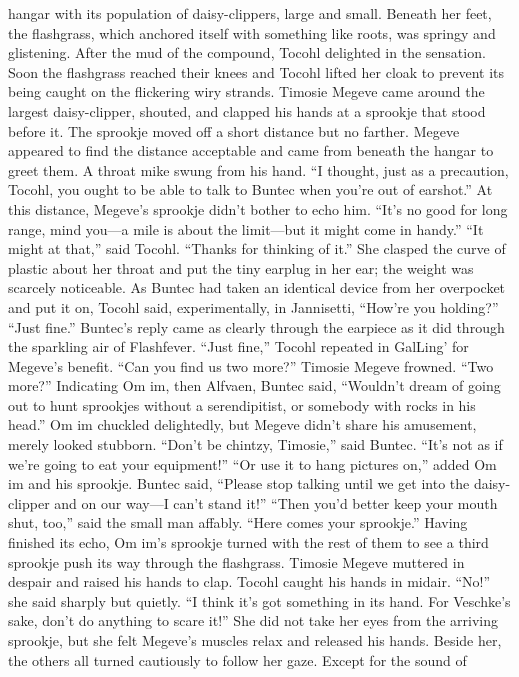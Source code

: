 \documentclass[9pt]{article}
\begin{document}
hangar with its population of daisy-clippers, large and small. Beneath her feet, the flashgrass, which
anchored itself with something like roots, was springy and glistening. After the mud of the compound,
Tocohl delighted in the sensation. Soon the flashgrass reached their knees and Tocohl lifted her cloak to
prevent its being caught on the flickering wiry strands.
Timosie Megeve came around the largest daisy-clipper, shouted, and clapped his hands at a
sprookje that stood before it. The sprookje moved off a short distance but no farther. Megeve appeared
to find the distance acceptable and came from beneath the hangar to greet them.
A throat mike swung from his hand. “I thought, just as a precaution, Tocohl, you ought to be able to
talk to Buntec when you’re out of earshot.”
At this distance, Megeve’s sprookje didn’t bother to echo him. “It’s no good for long range, mind
you—a mile is about the limit—but it might come in handy.”
“It might at that,” said Tocohl. “Thanks for thinking of it.” She clasped the curve of plastic about her
throat and put the tiny earplug in her ear; the weight was scarcely noticeable. As Buntec had taken an
identical device from her overpocket and put it on, Tocohl said, experimentally, in Jannisetti, “How’re
you holding?”
“Just fine.” Buntec’s reply came as clearly through the earpiece as it did through the sparkling air of
Flashfever. “Just fine,” Tocohl repeated in GalLing’ for Megeve’s benefit. “Can you find us two more?”
Timosie Megeve frowned. “Two more?”
Indicating Om im, then Alfvaen, Buntec said, “Wouldn’t dream of going out to hunt sprookjes
without a serendipitist, or somebody with rocks in his head.” Om im chuckled delightedly, but Megeve
didn’t share his amusement, merely looked stubborn.
“Don’t be chintzy, Timosie,” said Buntec. “It’s not as if we’re going to eat your equipment!”
“Or use it to hang pictures on,” added Om im and his sprookje.
Buntec said, “Please stop talking until we get into the daisy-clipper and on our way—I can’t stand
it!”
“Then you’d better keep your mouth shut, too,” said the small man affably. “Here comes your
sprookje.”
Having finished its echo, Om im’s sprookje turned with the rest of them to see a third sprookje push
its way through the flashgrass. Timosie Megeve muttered in despair and raised his hands to clap.
Tocohl caught his hands in midair. “No!” she said sharply but quietly. “I think it’s got something in its
hand. For Veschke’s sake, don’t do anything to scare it!”
She did not take her eyes from the arriving sprookje, but she felt Megeve’s muscles relax and
released his hands. Beside her, the others all turned cautiously to follow her gaze. Except for the sound of
\end{document}
